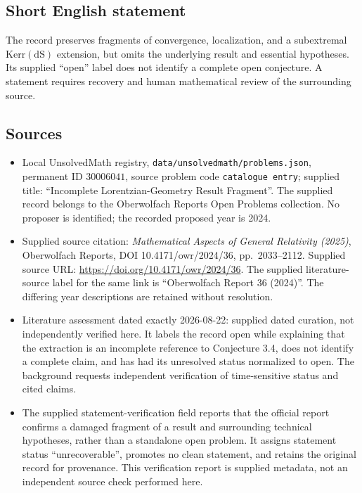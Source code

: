 \documentclass[11pt]{article}
\begin{document}
\subsection{Short English statement}
The record preserves fragments of convergence, localization, and a subextremal \(\mathrm{Kerr(dS)}\) extension, but omits the underlying result and essential hypotheses. Its supplied ``open'' label does not identify a complete open conjecture. A statement requires recovery and human mathematical review of the surrounding source.
\subsection{Sources}
\begin{itemize}
\item Local UnsolvedMath registry, \texttt{data/unsolvedmath/problems.json}, permanent ID \(30006041\), source problem code \texttt{catalogue entry}; supplied title: ``Incomplete Lorentzian-Geometry Result Fragment''. The supplied record belongs to the Oberwolfach Reports Open Problems collection. No proposer is identified; the recorded proposed year is 2024.
\item Supplied source citation: \emph{Mathematical Aspects of General Relativity (2025)}, Oberwolfach Reports, DOI 10.4171/owr/2024/36, pp.\ 2033--2112. Supplied source URL: \url{https://doi.org/10.4171/owr/2024/36}. The supplied literature-source label for the same link is ``Oberwolfach Report 36 (2024)''. The differing year descriptions are retained without resolution.
\item Literature assessment dated exactly 2026-08-22: supplied dated curation, not independently verified here. It labels the record open while explaining that the extraction is an incomplete reference to Conjecture 3.4, does not identify a complete claim, and has had its unresolved status normalized to open. The background requests independent verification of time-sensitive status and cited claims.
\item The supplied statement-verification field reports that the official report confirms a damaged fragment of a result and surrounding technical hypotheses, rather than a standalone open problem. It assigns statement status ``unrecoverable'', promotes no clean statement, and retains the original record for provenance. This verification report is supplied metadata, not an independent source check performed here.
\end{itemize}
\end{document}
